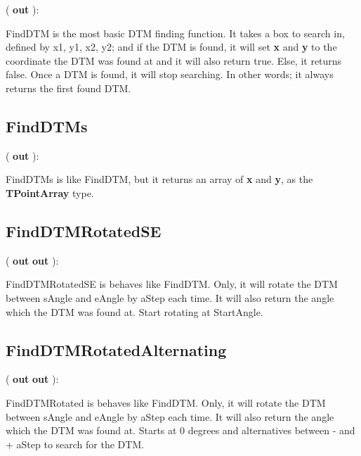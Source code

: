 \documentclass[a4paper]{report}
\begin{document}
\pfunc {}( \textbf{out}
   ):

FindDTM is the most basic DTM finding function. It takes a box to search in,
defined by x1, y1, x2, y2; and if the DTM is found, it will set \textbf{x} and 
\textbf{y} to the coordinate the DTM was found at and it will also return true. 
Else, it returns false. Once a DTM is found, it will stop searching. In other words; it always returns
the first found DTM.

\subsection{FindDTMs}

\pfunc {}( \textbf{out} 
  ):

FindDTMs is like FindDTM, but it returns an array of \textbf{x} and \textbf{y}, as the
\textbf{TPointArray} type.

\subsection{FindDTMRotatedSE}
\pfunc {}( \textbf{out }
   
  \textbf{out}
 ): 

FindDTMRotatedSE is behaves like FindDTM. Only, it will rotate the DTM between 
sAngle and eAngle by aStep each time. It will also return the angle which the
DTM was found at. Start rotating at StartAngle.

\subsection{FindDTMRotatedAlternating}
\pfunc {}(
\textbf{out }
   
  \textbf{out}
 ): 

FindDTMRotated is behaves like FindDTM. Only, it will rotate the DTM between 
sAngle and eAngle by aStep each time. It will also return the angle which the
DTM was found at. Starts at 0 degrees and alternatives between - and + aStep to search for the DTM.
\end{document}
